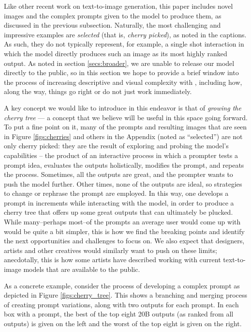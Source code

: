 Like other recent work on text-to-image generation, this paper includes novel images and the complex prompts given to the model to produce them, as discussed in the previous subsection. Naturally, the most challenging and impressive examples are \textit{selected} (that is, \textit{cherry picked}), as noted in the captions. As such, they do not typically represent, for example, a single shot interaction in which the model directly produces such an image as its most highly ranked output. As noted in section \ref{secs:broader}, we are unable to release our model directly to the public, so in this section we hope to provide a brief window into the process of increasing descriptive and visual complexity with \bdraw, including how, along the way, things go right or do not just work immediately.

A key concept we would like to introduce in this endeavor is that of \textit{growing the cherry tree} --- a concept that we believe will be useful in this space going forward. To put a fine point on it, many of the prompts and resulting images that are seen in Figure \ref{figs:cherries} and others in the Appendix (noted as ``selected'') are not only cherry picked: they are the result of exploring and probing the model's capabilities -- the product of an interactive process in which a prompter tests a prompt idea, evaluates the outputs holistically, modifies the prompt, and repeats the process. Sometimes, all the outputs are great, and the prompter wants to push the model further. Other times, none of the outputs are ideal, so strategies to change or rephrase the prompt are employed. In this way, one develops a prompt in increments while interacting with the model, in order to produce a cherry tree that offers up some great outputs that can ultimately be plucked. While many--perhaps most--of the prompts an average user would come up with would be quite a bit simpler, this is how we find the breaking points and identify the next opportunities and challenges to focus on. We also expect that designers, artists and other creatives would similarly want to push on these limits; anecdotally, this is how some artists have described working with current text-to-image models that are available to the public.

As a concrete example, consider the process of developing a complex prompt as depicted in Figure \ref{figs:cherry_tree}. This shows a branching and merging process of creating prompt variations, along with two outputs for each prompt. In each box with a prompt, the best of the top eight 20B \bdraw outputs (as ranked from all outputs) is given on the left and the worst of the top eight is given on the right. 


